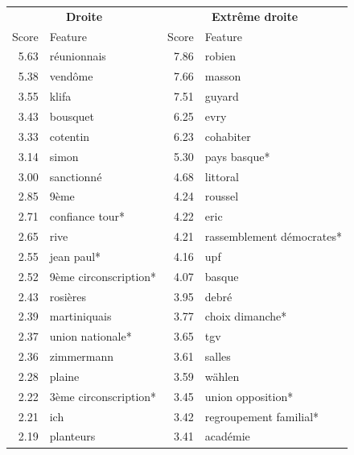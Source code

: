 \documentclass{article}
\begin{document}
\begin{table}[h]
\begin{tabular}{rlrl}
    \midrule
    \multicolumn{2}{c}{\textbf{Droite}} & \multicolumn{2}{c}{\textbf{Extr\^{e}me droite}} \\
    Score & Feature & Score & Feature \\
    \midrule
    5.63 & r\'{e}unionnais       & 7.86 & robien \\
    5.38 & vend\^{o}me           & 7.66 & masson \\
    3.55 & klifa                 & 7.51 & guyard \\
    3.43 & bousquet              & 6.25 & evry \\
    3.33 & cotentin              & 6.23 & cohabiter \\
    3.14 & simon                 & 5.30 & pays basque* \\
    3.00 & sanctionn\'{e}        & 4.68 & littoral \\
    2.85 & 9\`{e}me              & 4.24 & roussel \\
    2.71 & confiance tour*       & 4.22 & eric \\
    2.65 & rive                  & 4.21 & rassemblement d\'{e}mocrates* \\
    2.55 & jean paul*            & 4.16 & upf \\
    2.52 & 9\`{e}me circonscription* & 4.07 & basque \\
    2.43 & rosi\`{e}res          & 3.95 & debr\'{e} \\
    2.39 & martiniquais          & 3.77 & choix dimanche* \\
    2.37 & union nationale*      & 3.65 & tgv \\
    2.36 & zimmermann            & 3.61 & salles \\
    2.28 & plaine                & 3.59 & w\"{a}hlen \\
    2.22 & 3\`{e}me circonscription* & 3.45 & union opposition* \\
    2.21 & ich                   & 3.42 & regroupement familial* \\
    2.19 & planteurs             & 3.41 & acad\'{e}mie \\
    \bottomrule
  \end{tabular}
\end{table}


\newpage

\end{document}
